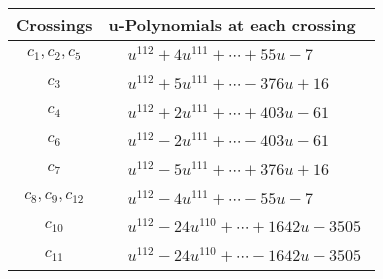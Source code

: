 \documentclass[1p]{elsarticle_modified}
\theoremstyle{definition}
\begin{document}
\begin{tabular}{m{50pt}|m{274pt}}
Crossings & \hspace{64pt}u-Polynomials at each crossing \\
\hline $$\begin{aligned}c_{1},c_{2},c_{5}\end{aligned}$$&$\begin{aligned}
&u^{112}+4 u^{111}+\cdots+55 u-7
\end{aligned}$\\
\hline $$\begin{aligned}c_{3}\end{aligned}$$&$\begin{aligned}
&u^{112}+5 u^{111}+\cdots-376 u+16
\end{aligned}$\\
\hline $$\begin{aligned}c_{4}\end{aligned}$$&$\begin{aligned}
&u^{112}+2 u^{111}+\cdots+403 u-61
\end{aligned}$\\
\hline $$\begin{aligned}c_{6}\end{aligned}$$&$\begin{aligned}
&u^{112}-2 u^{111}+\cdots-403 u-61
\end{aligned}$\\
\hline $$\begin{aligned}c_{7}\end{aligned}$$&$\begin{aligned}
&u^{112}-5 u^{111}+\cdots+376 u+16
\end{aligned}$\\
\hline $$\begin{aligned}c_{8},c_{9},c_{12}\end{aligned}$$&$\begin{aligned}
&u^{112}-4 u^{111}+\cdots-55 u-7
\end{aligned}$\\
\hline $$\begin{aligned}c_{10}\end{aligned}$$&$\begin{aligned}
&u^{112}-24 u^{110}+\cdots+1642 u-3505
\end{aligned}$\\
\hline $$\begin{aligned}c_{11}\end{aligned}$$&$\begin{aligned}
&u^{112}-24 u^{110}+\cdots-1642 u-3505
\end{aligned}$\\
\hline
\end{tabular}\\~\\
\end{document}
